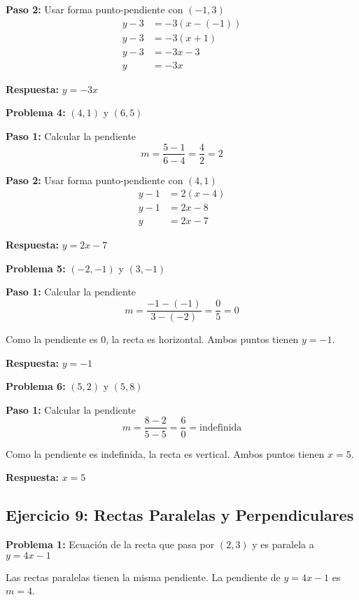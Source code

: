\textbf{Paso 2:} Usar forma punto-pendiente con $(-1, 3)$
\begin{align*}
y - 3 &= -3(x - (-1)) \\
y - 3 &= -3(x + 1) \\
y - 3 &= -3x - 3 \\
y &= -3x
\end{align*}

\textbf{Respuesta:} $y = -3x$

\medskip

\textbf{Problema 4:} $(4, 1)$ y $(6, 5)$

\textbf{Paso 1:} Calcular la pendiente
$$m = \frac{5 - 1}{6 - 4} = \frac{4}{2} = 2$$

\textbf{Paso 2:} Usar forma punto-pendiente con $(4, 1)$
\begin{align*}
y - 1 &= 2(x - 4) \\
y - 1 &= 2x - 8 \\
y &= 2x - 7
\end{align*}

\textbf{Respuesta:} $y = 2x - 7$

\medskip

\textbf{Problema 5:} $(-2, -1)$ y $(3, -1)$

\textbf{Paso 1:} Calcular la pendiente
$$m = \frac{-1 - (-1)}{3 - (-2)} = \frac{0}{5} = 0$$

Como la pendiente es 0, la recta es horizontal. Ambos puntos tienen $y = -1$.

\textbf{Respuesta:} $y = -1$

\medskip

\textbf{Problema 6:} $(5, 2)$ y $(5, 8)$

\textbf{Paso 1:} Calcular la pendiente
$$m = \frac{8 - 2}{5 - 5} = \frac{6}{0} = \text{indefinida}$$

Como la pendiente es indefinida, la recta es vertical. Ambos puntos tienen $x = 5$.

\textbf{Respuesta:} $x = 5$

\newpage

\subsection*{Ejercicio 9: Rectas Paralelas y Perpendiculares}

\textbf{Problema 1:} Ecuación de la recta que pasa por $(2, 3)$ y es paralela a $y = 4x - 1$

Las rectas paralelas tienen la misma pendiente. La pendiente de $y = 4x - 1$ es $m = 4$.

